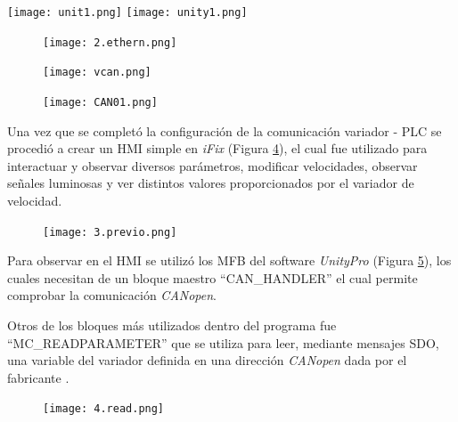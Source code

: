 \begin{center}
	\texttt{[image: unit1.png]}
	\label{fig:uni1}
	\texttt{[image: unity1.png]}
	\label{fig:uni0}
\end{center}



\begin{figure}[h]
	\centering
	\texttt{[image: 2.ethern.png]}
	\label{fig:inter}
\end{figure}

\begin{figure}[h]
	\centering
	\texttt{[image: vcan.png]}
	\label{fig:vcan}
\end{figure}

\begin{figure}[h]
	\centering
	\texttt{[image: CAN01.png]}
	\label{fig:CAN01}
\end{figure}

Una vez que se completó la configuración de la comunicación variador - PLC se procedió a crear un HMI simple en\textit{ iFix} (Figura \ref{fig:previo}), el cual fue utilizado para interactuar y observar diversos parámetros, modificar velocidades, observar señales luminosas y ver distintos valores proporcionados por el variador de velocidad.
 
\begin{figure}[H]
	\centering
	\texttt{[image: 3.previo.png]}
	\label{fig:previo}
\end{figure}

Para observar en el HMI se utilizó los MFB del software \textit{UnityPro} (Figura \ref{fig:read}), los cuales necesitan de un bloque maestro ``CAN\_HANDLER'' el cual permite comprobar la comunicación \textit{CANopen}.

Otros de los bloques más utilizados dentro del programa fue ``MC\_READPARAMETER'' que se utiliza para leer, mediante mensajes SDO, una variable del variador definida en una dirección \textit{CANopen} dada por el fabricante \cite{ComManual}.

\begin{figure}[H]
	\centering
	\texttt{[image: 4.read.png]}
	\label{fig:read}
\end{figure}




